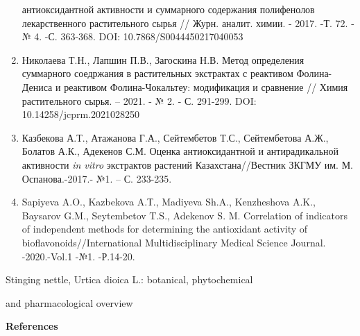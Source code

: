 \begin{references}
\begin{enumerate}
  антиоксидантной активности и суммарного содержания полифенолов
  лекарственного растительного сырья // Журн. аналит. химии. - 2017. -Т.
  72. -№ 4. -С. 363-368. DOI: 10.7868/S0044450217040053
\item
  Николаева Т.Н., Лапшин П.В., Загоскина Н.В. Метод определения
  суммарного соедржания в растительных экстрактах с реактивом
  Фолина-Дениса и реактивом Фолина-Чокальтеу: модификация и сравнение //
  Химия растительного сырья. -- 2021. - № 2. - С. 291-299. DOI:
  10.14258/jcprm.2021028250
\item
  Казбекова А.Т., Атажанова Г.А., Сейтембетов Т.С., Сейтембетова А.Ж.,
  Болатов А.К., Адекенов С.М. Оценка антиоксидантной и антирадикальной
  активности \emph{in vitro} экстрактов растений Казахстана//Вестник
  ЗКГМУ им. М. Оспанова.-2017.- №1. -- С. 233-235.
\item
  Sapiyeva A.O., Kazbekova A.Т., Madiyeva Sh.A., Kenzheshova A.K.,
  Baysarov G.M., Seytembetov T.S., Adekenov S. M. Correlation of
  indicators of independent methods for determining the antioxidant
  activity of bioflavonoids//International Multidisciplinary Medical
  Science Journal. -2020.-Vol.1 -№1. -Р.14-20.
\end{enumerate}

Stinging nettle, Urtica dioica L.: botanical, phytochemical

and pharmacological overview
\end{references}

\begin{center}
{\bfseries References}
\end{center}

